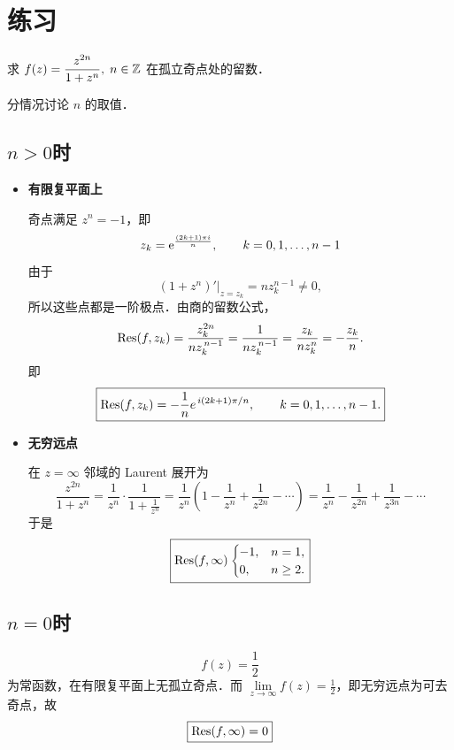 \documentclass[12pt, a4paper, oneside, UTF8]{ctexbook}
\begin{document}
\section{练习}
\begin{exercise}
    求 $f(z) = \dfrac{z^{2n}}{1+z^n},\; n \in \mathbb{Z}$ 在孤立奇点处的留数．
\end{exercise}
\begin{solution}
    分情况讨论 $n$ 的取值．

    \subsection*{$n>0$时}
    \begin{itemize}
        \item \textbf{有限复平面上}
            
            奇点满足 $z^n=-1$，即
            \[
            z_k=\mathrm{e}^{\frac{(2k+1)\pi i}{n}}, \qquad k=0,1,\ldots,n-1
            \]
            由于
            \[ \left.(1+z^n)'\right|_{z=z_k} =nz_k^{n-1}\ne0, \]
            所以这些点都是一阶极点．由商的留数公式，
            \[
            \Res(f,z_k)=\frac{z_k^{2n}}{n z_k^{\,n-1}}
            =\frac{1}{n z_k^{\,n-1}}
            =\frac{z_k}{n z_k^n}
            =-\frac{z_k}{n}.
            \]
            即
            \[
            \boxed{\Res(f,z_k)=-\frac{1}{n}e^{\,i(2k+1)\pi/n},\qquad k=0,1,\dots,n-1.}
            \]
        \item \textbf{无穷远点}
            
            在 $z=\infty$ 邻域的 Laurent 展开为
            \[ \frac{z^{2n}}{1+z^n} = \frac{1}{z^n} \cdot \frac{1}{1+\frac{1}{z^n}} = \frac{1}{z^n} \left(1 - \frac{1}{z^n} + \frac{1}{z^{2n}} - \cdots \right) = \frac{1}{z^n} - \frac{1}{z^{2n}} + \frac{1}{z^{3n}} - \cdots \]
            于是
            \[\boxed{\Res(f,\infty)\begin{cases}
                -1, & n=1, \\
                0, & n\ge2.
            \end{cases}}\]
    \end{itemize}

    \subsection*{$n=0$时}
    \[
    f(z)=\frac12
    \]
    为常函数，在有限复平面上无孤立奇点．而 $\lim\limits_{z\to\infty}f(z)=\frac12$，即无穷远点为可去奇点，故
    \[\boxed{\Res(f,\infty)=0}\]


\end{solution}
\end{document}
